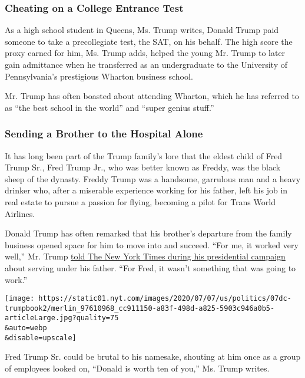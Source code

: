 \hypertarget{cheating-on-a-college-entrance-test}{%
\subsubsection{Cheating on a College Entrance
Test}\label{cheating-on-a-college-entrance-test}}

As a high school student in Queens, Ms. Trump writes, Donald Trump paid
someone to take a precollegiate test, the SAT, on his behalf. The high
score the proxy earned for him, Ms. Trump adds, helped the young Mr.
Trump to later gain admittance when he transferred as an undergraduate
to the University of Pennsylvania's prestigious Wharton business school.

Mr. Trump has often boasted about attending Wharton, which he has
referred to as ``the best school in the world'' and ``super genius
stuff.''

\hypertarget{sending-a-brother-to-the-hospital-alone}{%
\subsubsection{Sending a Brother to the Hospital
Alone}\label{sending-a-brother-to-the-hospital-alone}}

It has long been part of the Trump family's lore that the eldest child
of Fred Trump Sr., Fred Trump Jr., who was better known as Freddy, was
the black sheep of the dynasty. Freddy Trump was a handsome, garrulous
man and a heavy drinker who, after a miserable experience working for
his father, left his job in real estate to pursue a passion for flying,
becoming a pilot for Trans World Airlines.

Donald Trump has often remarked that his brother's departure from the
family business opened space for him to move into and succeed. ``For me,
it worked very well,'' Mr. Trump
\href{https://www.nytimes.com/2016/01/03/us/politics/for-donald-trump-lessons-from-a-brothers-suffering.html}{told
The New York Times during his presidential campaign} about serving under
his father. ``For Fred, it wasn't something that was going to work.''

\texttt{[image: https://static01.nyt.com/images/2020/07/07/us/politics/07dc-trumpbook2/merlin\_97610968\_cc911150-a83f-498d-a825-5903c946a0b5-articleLarge.jpg?quality=75\\\&auto=webp\\\&disable=upscale]}

Fred Trump Sr. could be brutal to his namesake, shouting at him once as
a group of employees looked on, ``Donald is worth ten of you,'' Ms.
Trump writes.

